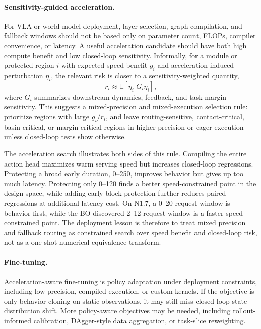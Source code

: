 \documentclass[10pt]{article}
\begin{document}
\paragraph{Sensitivity-guided acceleration.}
For VLA or world-model deployment, layer selection, graph compilation, and fallback windows should not be based only on parameter count, FLOPs, compiler convenience, or latency. A useful acceleration candidate should have both high compute benefit and low closed-loop sensitivity. Informally, for a module or protected region $i$ with expected speed benefit $g_i$ and acceleration-induced perturbation $\eta_i$, the relevant risk is closer to a sensitivity-weighted quantity,
\begin{equation}
    r_i \approx \mathbb{E}\left[\eta_i^\top G_i \eta_i\right],
\end{equation}
where $G_i$ summarizes downstream dynamics, feedback, and task-margin sensitivity. This suggests a mixed-precision and mixed-execution selection rule: prioritize regions with large $g_i/r_i$, and leave routing-sensitive, contact-critical, basin-critical, or margin-critical regions in higher precision or eager execution unless closed-loop tests show otherwise.

The acceleration search illustrates both sides of this rule. Compiling the entire action head maximizes warm serving speed but increases closed-loop regressions. Protecting a broad early duration, 0--250, improves behavior but gives up too much latency. Protecting only 0--120 finds a better speed-constrained point in the design space, while adding early-block protection further reduces paired regressions at additional latency cost. On N1.7, a 0--20 request window is behavior-first, while the BO-discovered 2--12 request window is a faster speed-constrained point. The deployment lesson is therefore to treat mixed precision and fallback routing as constrained search over speed benefit and closed-loop risk, not as a one-shot numerical equivalence transform.

\paragraph{Fine-tuning.}
Acceleration-aware fine-tuning is policy adaptation under deployment constraints, including low precision, compiled execution, or custom kernels. If the objective is only behavior cloning on static observations, it may still miss closed-loop state distribution shift. More policy-aware objectives may be needed, including rollout-informed calibration, DAgger-style data aggregation, or task-slice reweighting.
\end{document}
